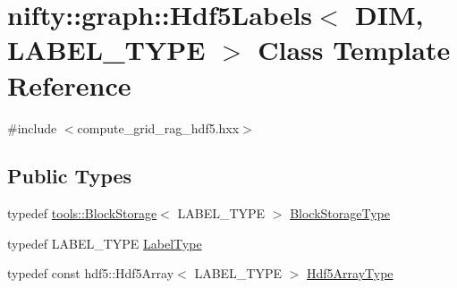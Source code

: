 \hypertarget{classnifty_1_1graph_1_1Hdf5Labels}{}\section{nifty\+:\+:graph\+:\+:Hdf5\+Labels$<$ D\+IM, L\+A\+B\+E\+L\+\_\+\+T\+Y\+PE $>$ Class Template Reference}
\label{classnifty_1_1graph_1_1Hdf5Labels}


{\ttfamily \#include $<$compute\+\_\+grid\+\_\+rag\+\_\+hdf5.\+hxx$>$}

\subsection*{Public Types}
\begin{DoxyCompactItemize}
\item 
typedef \hyperlink{classnifty_1_1tools_1_1BlockStorage}{tools\+::\+Block\+Storage}$<$ L\+A\+B\+E\+L\+\_\+\+T\+Y\+PE $>$ \hyperlink{classnifty_1_1graph_1_1Hdf5Labels_abfffba953f16947d3907634b3aabdcad}{Block\+Storage\+Type}
\item 
typedef L\+A\+B\+E\+L\+\_\+\+T\+Y\+PE \hyperlink{classnifty_1_1graph_1_1Hdf5Labels_a478cbee39d8a05949fe2fe4f9dd4f382}{Label\+Type}
\item 
typedef const hdf5\+::\+Hdf5\+Array$<$ L\+A\+B\+E\+L\+\_\+\+T\+Y\+PE $>$ \hyperlink{classnifty_1_1graph_1_1Hdf5Labels_a2cfeca010fa78ee8fdfa1767ae0fbe4a}{Hdf5\+Array\+Type}
\end{DoxyCompactItemize}
